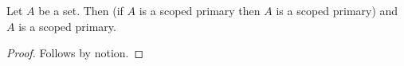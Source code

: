 

\begin{proposition}\label{horn_scoped_missing}
    Let $A$ be a set.
    Then (if $A$ is a scoped primary then $A$ is a scoped primary) and $A$ is a scoped primary.
\end{proposition}
\begin{proof}
    Follows by notion.
\end{proof}
